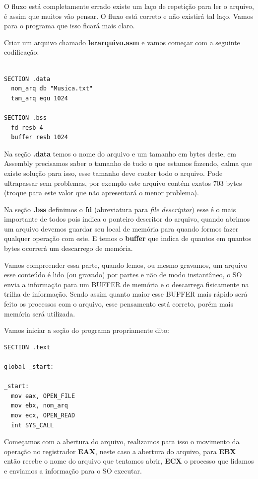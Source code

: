 O fluxo está completamente errado existe um laço de repetição para ler o arquivo, é assim que muitos vão pensar. O fluxo está correto e não existirá tal laço. Vamos para o programa que isso ficará mais claro.

Criar um arquivo chamado \textbf{lerarquivo.asm} e vamos começar com a seguinte codificação:
\begin{lstlisting}[]
%include 'bibliotecaE.inc'

SECTION .data
  nom_arq db "Musica.txt"
  tam_arq equ 1024

SECTION .bss
  fd resb 4
  buffer resb 1024
\end{lstlisting}	

Na seção \textbf{.data} temos o nome do arquivo e um tamanho em bytes deste, em Assembly precisamos saber o tamanho de tudo o que estamos fazendo, calma que existe solução para isso, esse tamanho deve conter todo o arquivo. Pode ultrapassar sem problemas, por exemplo este arquivo contém exatos 703 bytes (troque para este valor que não apresentará o menor problema).

Na seção \textbf{.bss} definimos o \textbf{fd} (abreviatura para \textit{file descriptor}) esse é o mais importante de todos pois indica o ponteiro descritor do arquivo, quando abrimos um arquivo devemos guardar seu local de memória para quando formos fazer qualquer operação com este. E temos o \textbf{buffer} que indica de quantos em quantos bytes ocorrerá um descarrego de memória.

Vamos compreender essa parte, quando lemos, ou mesmo gravamos, um arquivo esse conteúdo é lido (ou gravado) por partes e não de modo instantâneo, o SO envia a informação para um BUFFER de memória e o descarrega fisicamente na trilha de informação. Sendo assim quanto maior esse BUFFER mais rápido será feito os processos com o arquivo, esse pensamento está correto, porém mais memória será utilizada. 

Vamos iniciar a seção do programa propriamente dito:
\begin{lstlisting}[]
SECTION .text

global _start:

_start:
  mov eax, OPEN_FILE
  mov ebx, nom_arq
  mov ecx, OPEN_READ
  int SYS_CALL	
\end{lstlisting}	

Começamos com a abertura do arquivo, realizamos para isso o movimento da operação no registrador \textbf{EAX}, neste caso a abertura do arquivo, para \textbf{EBX} então recebe o nome do arquivo que tentamos abrir, \textbf{ECX} o processo que lidamos e enviamos a informação para o SO executar.


